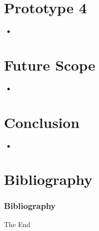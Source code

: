 \documentclass{beamer}
\begin{document}
\clearpage

\section{Prototype 4}
\begin{frame}
\begin{itemize}
\item
\end{itemize}

\end{frame}


\clearpage

\section{Future Scope}
\begin{frame}
\begin{itemize}
\item
\end{itemize}

\end{frame}


\clearpage

\section{Conclusion}
\begin{frame}
\begin{itemize}
\item
\end{itemize}

\end{frame}


\clearpage

\section{Bibliography}
\begin{frame}[allowframebreaks]
	\frametitle{Bibliography}
	\nocite{*} 
	 
	
\end{frame}

\clearpage


\begin{frame}
\Huge{\centerline{The End}}
\end{frame}

\end{document}
